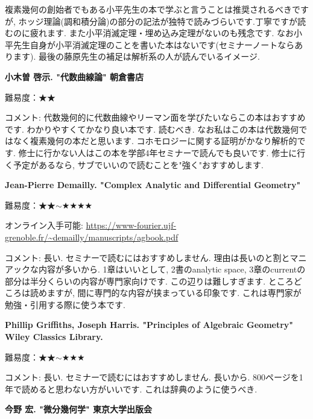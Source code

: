 複素幾何の創始者でもある小平先生の本で学ぶと言うことは推奨されるべきですが, ホッジ理論(調和積分論)の部分の記法が独特で読みづらいです.丁寧ですが読むのに疲れます. また小平消滅定理・埋め込み定理がないのも残念です.  なお小平先生自身が小平消滅定理のことを書いた本はないです(セミナーノートならあります). 最後の藤原先生の補足は解析系の人が読んでいるイメージ. 
\vspace{8pt}

\textbf{小木曽 啓示. "代数曲線論" 朝倉書店}\vspace{-6pt}

難易度：★★ \vspace{-6pt} 

コメント: 代数幾何的に代数曲線やリーマン面を学びたいならこの本はおすすめです. わかりやすくてかなり良い本です. 読むべき. 
なお私はこの本は代数幾何ではなく複素幾何の本だと思います. コホモロジーに関する証明がかなり解析的です. 修士に行かない人はこの本を学部4年セミナーで読んでも良いです. 修士に行く予定があるなら, サブでいいので読むことを"強く"おすすめします. 
\vspace{8pt}

\textbf{Jean-Pierre Demailly. "Complex Analytic and Differential Geometry"} \vspace{-6pt}

難易度：★★$\sim$★★★★  \vspace{-6pt}

オンライン入手可能: \url{https://www-fourier.ujf-grenoble.fr/~demailly/manuscripts/agbook.pdf}\vspace{-6pt}

コメント: 長い. セミナーで読むにはおすすめしません. 理由は長いのと割とマニアックな内容が多いから. 1章はいいとして, 2書のanalytic space, 3章のcurrentの部分は半分くらいの内容が専門家向けです. この辺りは難しすぎます. ところどころは読めますが, 間に専門的な内容が挟まっている印象です. これは専門家が勉強・引用する際に使う本です. 
\vspace{8pt}

\textbf{Phillip Griffiths, Joseph Harris. "Principles of Algebraic Geometry" Wiley Classics Library.}  \vspace{-6pt}

難易度：★★$\sim$★★★ \vspace{-6pt} 

コメント: 長い. セミナーで読むにはおすすめしません. 長いから. 800ページを1年で読めると思わない方がいいです. これは辞典のように使うべき. 
\vspace{8pt}

\textbf{今野 宏. "微分幾何学" 東京大学出版会}  \vspace{-6pt}

